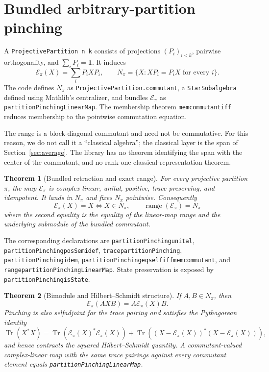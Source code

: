 \documentclass[11pt]{article}
\renewcommand{\_}{\textunderscore\allowbreak}
\newtheorem{theorem}{Theorem}
\theoremstyle{remark}
\newcommand{\Tr}{\operatorname{Tr}}
\newcommand{\one}{\mathbf 1}
\newcommand{\pinch}{\mathcal E}
\begin{document}
\section{Bundled arbitrary-partition pinching}
\label{sec:pinching}

A \texttt{ProjectivePartition n k} consists of projections
$(P_i)_{i<k}$, pairwise orthogonality, and $\sum_iP_i=\one$. It induces
\[
 \pinch_\pi(X)=\sum_iP_iXP_i,
 \qquad
 N_\pi=\{X:XP_i=P_iX\text{ for every }i\}.
\]
The code defines $N_\pi$ as
\texttt{ProjectivePartition.commutant}, a
\texttt{StarSubalgebra} defined using Mathlib's centralizer, and bundles
$\pinch_\pi$ as \texttt{partitionPinchingLinearMap}. The membership theorem
\texttt{mem\_commutant\_iff} reduces membership to the pointwise commutation
equation.

The range is a block-diagonal commutant and need not be commutative. For this
reason, we do not call it a ``classical algebra''; the classical layer is the
span of Section~\ref{sec:average}. The library has no theorem identifying
the span with the center of the commutant, and no rank-one
classical-representation theorem.

\begin{theorem}[Bundled retraction and exact range]
\label{thm:pinching-range}
For every projective partition $\pi$, the map $\pinch_\pi$ is complex linear,
unital, positive, trace preserving, and idempotent. It lands in $N_\pi$ and
fixes $N_\pi$ pointwise. Consequently
\[
 \pinch_\pi(X)=X \Longleftrightarrow X\in N_\pi,
 \qquad
 \operatorname{range}(\pinch_\pi)=N_\pi
\]
where the second equality is the equality of the linear-map range and the
underlying submodule of the bundled commutant.
\end{theorem}

{\raggedright
The corresponding declarations are
\texttt{partitionPinching\_unital},
\texttt{partitionPinching\_posSemidef},
\texttt{trace\_partitionPinching},
\texttt{partitionPinching\_idem},
\texttt{partitionPinching\_eq\_self\_iff\_mem\_commutant}, and
\texttt{range\_partitionPinchingLinearMap}. State preservation is exposed by
\texttt{partitionPinching\_isState}.\par}


\begin{theorem}[Bimodule and Hilbert--Schmidt structure]
\label{thm:pinching-geometry}
If $A,B\in N_\pi$, then
\[
 \pinch_\pi(AXB)=A\pinch_\pi(X)B.
\]
Pinching is also selfadjoint for the trace pairing and satisfies the
Pythagorean identity
\[
 \Tr(X^*X)=
 \Tr(\pinch_\pi(X)^*\pinch_\pi(X))+
 \Tr((X-\pinch_\pi(X))^*(X-\pinch_\pi(X))),
\]
and hence contracts the squared Hilbert--Schmidt quantity. A
commutant-valued complex-linear map with the same trace pairings against every
commutant element equals
\texttt{partitionPinching\allowbreak LinearMap}.
\end{theorem}
\end{document}

